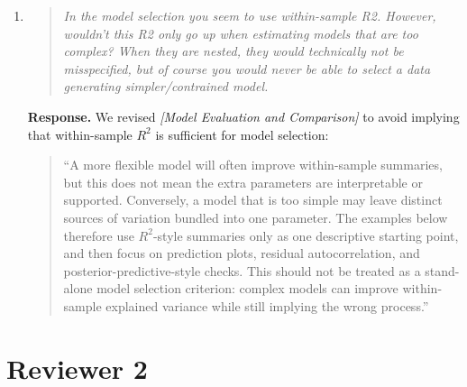 \documentclass[11pt]{article}
\newcommand{\response}{\textbf{Response.} }
\newcommand{\secit}[1]{\textit{[#1]}}
\newcommand{\msq}[1]{\begin{quote}\small\noindent``#1''\end{quote}}
\newenvironment{reviewerpoint}{\begin{quote}\itshape}{\end{quote}}
\begin{document}
\begin{enumerate}[label=\textbf{Reviewer 1, Minor Point \arabic*.}]
\response Instead of two examples with time dependent moderators, we replaced one with an example that demonstrates moderation based on a latent process instead, so readers are more aware of such possibilities in \secit{Latent State Moderation of System Parameters}. 
\item

\begin{reviewerpoint}
In the model selection you seem to use within-sample R2.
However, wouldn't this R2 only go up when estimating models that are too complex?
When they are nested, they would technically not be misspecified, but of course you would never be able to select a data generating simpler/contrained model.
\end{reviewerpoint}

\response We revised \secit{Model Evaluation and Comparison} to avoid implying that within-sample \(R^2\) is sufficient for model selection:
\msq{A more flexible model will often improve within-sample summaries, but this does not mean the extra parameters are interpretable or supported.
Conversely, a model that is too simple may leave distinct sources of variation bundled into one parameter.
The examples below therefore use $R^2$-style summaries only as one descriptive starting point, and then focus on prediction plots, residual autocorrelation, and posterior-predictive-style checks.
This should not be treated as a stand-alone model selection criterion: complex models can improve within-sample explained variance while still implying the wrong process.}
\end{enumerate}


\section*{Reviewer 2}
\end{document}

